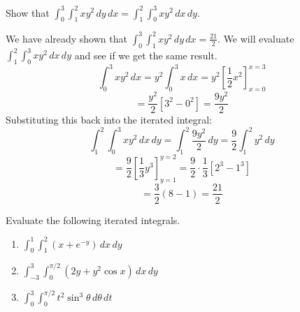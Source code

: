 \begin{Exercise}[title = {Order of Evaluating Iterated Integrals}, label = 
iterate 1]
Show that $\int_0^3 \int_1^2 x y^2\,dy\,dx = \int_1^2 \int_0^3 x y^2 \,dx\,dy$.
\end{Exercise}

\begin{Answer}[ref = iterate_1]
We have already shown that $\int_0^3 \int_1^2 x y^2\,dy\,dx = \frac{21}{2}$. 
We will evaluate $\int_1^2 \int_0^3 x y^2 \,dx\,dy$ and see if we get the same 
result. 
$$\int_0^3 x y^2 \,dx = y^2 \int_0^3 x\,dx = y^2 \left[ \frac{1}{2}x^2 \right]_
{x = 0}^{x = 3}$$
$$= \frac{y^2}{2} \left[ 3^2 - 0^2 \right] = \frac{9y^2}{2}$$
Substituting this back into the iterated integral:
$$\int_1^2 \int_0^3 x y^2 \,dx\,dy = \int_1^2 \frac{9y^2}{2}\,dy = \frac{9}{2} 
\int_1^2 y^2 \,dy$$
$$= \frac{9}{2} \left[ \frac{1}{3}y^3 \right]_{y = 1}^{y = 2} = \frac{9}{2} 
\cdot \frac{1}{3} \left[ 2^3 - 1^3 \right]$$
$$= \frac{3}{2}(8 - 1) = \frac{21}{2}$$
\end{Answer}

\begin{Exercise}[title = {Evaluating Iterated Integrals}, label = iterate_2]
Evaluate the following iterated integrals.
\begin{enumerate}
\item $\int_0^1 \int_1^2 \left( x + e^{-y} \right)\,dx\,dy$
\item $\int_{-3}^3 \int_{0}^{\pi/2} \left( 2y + y^2 \cos{x} \right)\,dx\,dy$
\item $\int_0^3 \int_0^{\pi/2} t^2 \sin^3{\theta}\,d\theta\,dt$
\end{enumerate}
\vspace{100mm}
\end{Exercise}

